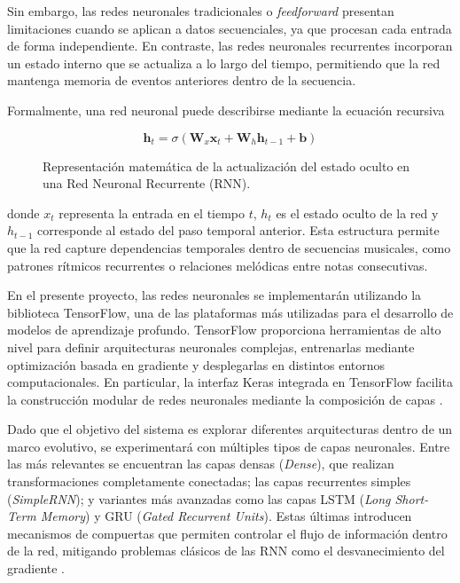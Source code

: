 \documentclass[12pt]{report}
\begin{document}
Sin embargo, las redes neuronales tradicionales o \textit{feedforward} \cite{rumelhart1986learning} presentan limitaciones cuando se aplican a datos secuenciales, ya que procesan cada entrada de forma independiente. En contraste, las redes neuronales recurrentes incorporan un estado interno que se actualiza a lo largo del tiempo, permitiendo que la red mantenga memoria de eventos anteriores dentro de la secuencia.

Formalmente, una red neuronal puede describirse mediante la ecuación recursiva

\begin{figure}[htbp]
    \centering
    \begin{equation}
        \mathbf{h}_t = \sigma(\mathbf{W}_x \mathbf{x}_t + \mathbf{W}_h \mathbf{h}_{t-1} + \mathbf{b})
        \label{eq:rnn_recursiva}
    \end{equation}
    \caption{Representación matemática de la actualización del estado oculto en una Red Neuronal Recurrente (RNN).}
\end{figure}

donde $x_t$ representa la entrada en el tiempo $t$, $h_t$ es el estado oculto de la red y $h_{t-1}$ corresponde al estado del paso temporal anterior. Esta estructura permite que la red capture dependencias temporales dentro de secuencias musicales, como patrones rítmicos recurrentes o relaciones melódicas entre notas consecutivas.

En el presente proyecto, las redes neuronales se implementarán utilizando la biblioteca TensorFlow, una de las plataformas más utilizadas para el desarrollo de modelos de aprendizaje profundo. TensorFlow proporciona herramientas de alto nivel para definir arquitecturas neuronales complejas, entrenarlas mediante optimización basada en gradiente y desplegarlas en distintos entornos computacionales. En particular, la interfaz Keras integrada en TensorFlow facilita la construcción modular de redes neuronales mediante la composición de capas \cite{abadi2016tensorflow}.

Dado que el objetivo del sistema es explorar diferentes arquitecturas dentro de un marco evolutivo, se experimentará con múltiples tipos de capas neuronales. Entre las más relevantes se encuentran las capas densas (\textit{Dense}), que realizan transformaciones completamente conectadas; las capas recurrentes simples (\textit{SimpleRNN}); y variantes más avanzadas como las capas LSTM (\textit{Long Short-Term Memory}) y GRU (\textit{Gated Recurrent Units}). Estas últimas introducen mecanismos de compuertas que permiten controlar el flujo de información dentro de la red, mitigando problemas clásicos de las RNN como el desvanecimiento del gradiente \cite{bengio1994learning}.
\end{document}
